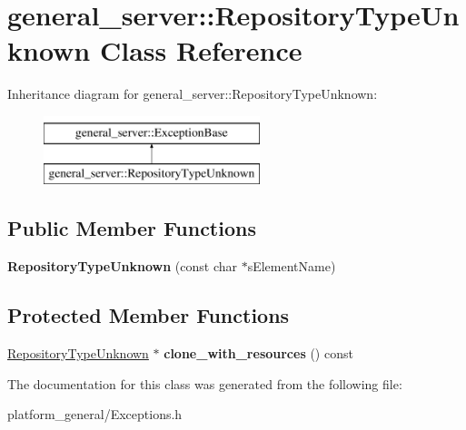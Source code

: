 \hypertarget{classgeneral__server_1_1RepositoryTypeUnknown}{\section{general\-\_\-server\-:\-:\-Repository\-Type\-Unknown \-Class \-Reference}
\label{classgeneral__server_1_1RepositoryTypeUnknown}
}
\-Inheritance diagram for general\-\_\-server\-:\-:\-Repository\-Type\-Unknown\-:\begin{figure}[H]
\begin{center}
\leavevmode
\includegraphics[height=2.000000cm]{classgeneral__server_1_1RepositoryTypeUnknown}
\end{center}
\end{figure}
\subsection*{\-Public \-Member \-Functions}
\begin{DoxyCompactItemize}
\item 
\hypertarget{classgeneral__server_1_1RepositoryTypeUnknown_acdf8b0e41aa6a7e5a7b4d5969e75ad4e}{{\bfseries \-Repository\-Type\-Unknown} (const char $\ast$s\-Element\-Name)}\label{classgeneral__server_1_1RepositoryTypeUnknown_acdf8b0e41aa6a7e5a7b4d5969e75ad4e}

\end{DoxyCompactItemize}
\subsection*{\-Protected \-Member \-Functions}
\begin{DoxyCompactItemize}
\item 
\hypertarget{classgeneral__server_1_1RepositoryTypeUnknown_a9c472e87544c7655105d4ce608fde95c}{\hyperlink{classgeneral__server_1_1RepositoryTypeUnknown}{\-Repository\-Type\-Unknown} $\ast$ {\bfseries clone\-\_\-with\-\_\-resources} () const }\label{classgeneral__server_1_1RepositoryTypeUnknown_a9c472e87544c7655105d4ce608fde95c}

\end{DoxyCompactItemize}


\-The documentation for this class was generated from the following file\-:\begin{DoxyCompactItemize}
\item 
platform\-\_\-general/\-Exceptions.\-h\end{DoxyCompactItemize}
